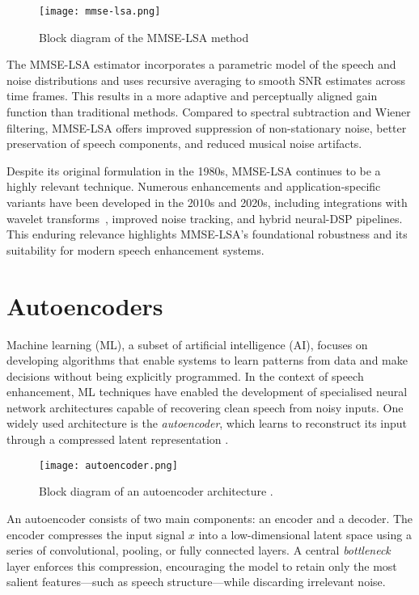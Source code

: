 \begin{figure}[H]
    \centering
    \texttt{[image: mmse-lsa.png]}
    \caption{\label{fig:mmse_lsa_block} Block diagram of the MMSE-LSA method}
\end{figure}

The MMSE-LSA estimator incorporates a parametric model of the speech and noise distributions and uses recursive averaging to smooth SNR estimates across time frames. This results in a more adaptive and perceptually aligned gain function than traditional methods. Compared to spectral subtraction and Wiener filtering, MMSE-LSA offers improved suppression of non-stationary noise, better preservation of speech components, and reduced musical noise artifacts.

Despite its original formulation in the 1980s, MMSE-LSA continues to be a highly relevant technique. Numerous enhancements and application-specific variants have been developed in the 2010s and 2020s, including integrations with wavelet transforms~\cite{wei2016mmse}, improved noise tracking, and hybrid neural-DSP pipelines. This enduring relevance highlights MMSE-LSA's foundational robustness and its suitability for modern speech enhancement systems.

\section{Autoencoders}
\label{sec:autoencoders}

Machine learning (ML), a subset of artificial intelligence (AI), focuses on developing algorithms that enable systems to learn patterns from data and make decisions without being explicitly programmed. In the context of speech enhancement, ML techniques have enabled the development of specialised neural network architectures capable of recovering clean speech from noisy inputs. One widely used architecture is the \textit{autoencoder}, which learns to reconstruct its input through a compressed latent representation \cite{azarang2020review}.

\begin{figure}[h]
    \centering
    \texttt{[image: autoencoder.png]}
    \caption{\label{fig:autoencoder} Block diagram of an autoencoder architecture \cite{vachhani2017dae}.}
\end{figure}

An autoencoder consists of two main components: an encoder and a decoder. The encoder compresses the input signal \(x\) into a low-dimensional latent space using a series of convolutional, pooling, or fully connected layers. A central \textit{bottleneck} layer enforces this compression, encouraging the model to retain only the most salient features—such as speech structure—while discarding irrelevant noise.

